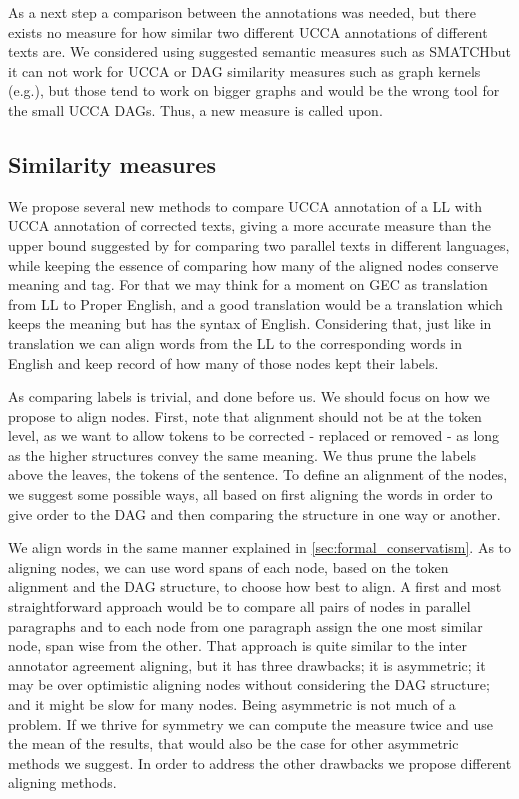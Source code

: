\documentclass[english]{article}
\begin{document}
As a next step a comparison between the annotations was needed, but
there exists no measure for how similar two different UCCA annotations
of different texts are. We considered using suggested semantic measures
such as SMATCH\cite{cai2013smatch}but it can not work for UCCA or
DAG similarity measures such as graph kernels (e.g.\cite{kashima2003marginalized}),
but those tend to work on bigger graphs and would be the wrong tool
for the small UCCA DAGs. Thus, a new measure is called upon.

\subsection{Similarity measures\label{subsec:Similarity-measures}}

We propose several new methods to compare UCCA annotation of a LL with UCCA annotation of corrected texts, giving a more accurate
measure than the upper bound suggested by \cite{sulem2015conceptual}for
comparing two parallel texts in different languages, while keeping
the essence of comparing how many of the aligned nodes conserve meaning
and tag. For that we may think for a moment on GEC as
translation from LL to Proper English, and a good translation
would be a translation which keeps the meaning but has the syntax
of English. Considering that, just like in translation we can align
words from the LL to the corresponding words in English
and keep record of how many of those nodes kept their labels.

As comparing labels is trivial, and done before us. We should focus on how we propose to
align nodes. First, note that alignment should not be at
the token level, as we want to allow tokens to be corrected - replaced or removed -
as long as the higher structures convey the same meaning. We thus
prune the labels above the leaves, the tokens of the sentence. To
define an alignment of the nodes, we suggest some possible ways, all
based on first aligning the words in order to give order to the DAG
and then comparing the structure in one way or another.

We align words in the same manner explained in \ref{sec:formal_conservatism}. As to aligning nodes, we can use word spans of each node, based on
the token alignment and the DAG structure, to choose how best to align.
A first and most straightforward approach would be to compare all
pairs of nodes in parallel paragraphs and to each node from one paragraph
assign the one most similar node, span wise from the other. That approach
is quite similar to the inter annotator agreement aligning, but it
has three drawbacks; it is asymmetric; it may be over optimistic aligning
nodes without considering the DAG structure; and it might be
slow for many nodes. Being asymmetric is not much of a problem. If we thrive for symmetry
we can compute the measure twice and use the mean of the results,
that would also be the case for other asymmetric methods we suggest.
In order to address the other drawbacks we propose different aligning methods.
\end{document}
